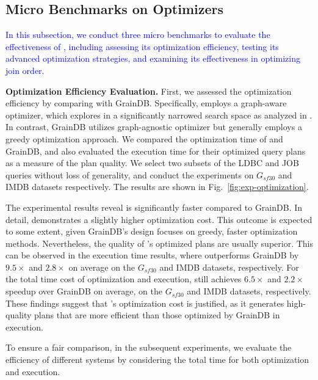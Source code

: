 \subsection{Micro Benchmarks on Optimizers}
\label{sec:experiment-opt}
\textcolor{blue}{
In this subsection, we conduct three micro benchmarks to evaluate the effectiveness of \name,
including assessing its optimization efficiency, testing its advanced optimization strategies, and examining its effectiveness in optimizing join order.
}

\noindent\textbf{Optimization Efficiency Evaluation.}
First, we assessed the optimization efficiency by comparing \name with GrainDB\cite{graindb}. 
Specifically, \name employs a graph-aware optimizer, which explores in a significantly narrowed search space as analyzed in . 
In contrast, GrainDB utilizes graph-agnostic optimizer but generally employs a greedy optimization approach.
We compared the optimization time of \name and GrainDB, and also evaluated the execution time for their optimized query plans as a measure of the plan quality.
We select two subsets of the LDBC and JOB queries without loss of generality, and conduct the experiments on $G_{sf30}$ and IMDB datasets respectively.
The results are shown in Fig.~\ref{fig:exp-optimization}.

The experimental results reveal \name is significantly faster compared to GrainDB.
In detail, \name demonstrates a slightly higher optimization cost. This outcome is expected to some extent, given GrainDB's design focuses on greedy, faster optimization methods.
Nevertheless, the quality of \name's optimized plans are usually superior. This can be observed in the execution time results, where \name outperforms GrainDB by $9.5\times$ and $2.8\times$ on average on the $G_{sf30}$ and IMDB datasets, respectively.
For the total time cost of optimization and execution, \name still achieves $6.5\times$ and $2.2\times$ speedup over GrainDB on average, on the $G_{sf30}$ and IMDB datasets, respectively.
These findings suggest that \name's optimization cost is justified, as it generates high-quality plans that are more efficient than those optimized by GrainDB in execution.

To ensure a fair comparison, in the subsequent experiments, we evaluate the efficiency of different systems by considering the total time for both optimization and execution.

